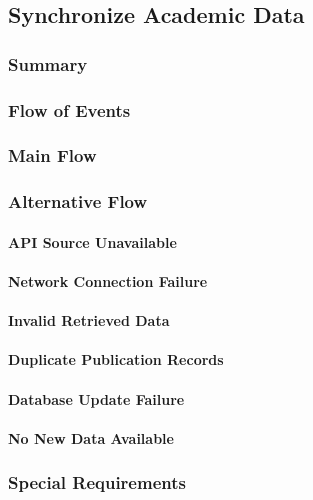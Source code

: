 \subsection{Synchronize Academic Data}
\subsubsection{Summary}

\subsubsection{Flow of Events}
\subsubsection*{Main Flow}

\subsubsection*{Alternative Flow}
\paragraph{API Source Unavailable}

\paragraph{Network Connection Failure}

\paragraph{Invalid Retrieved Data}

\paragraph{Duplicate Publication Records}

\paragraph{Database Update Failure}

\paragraph{No New Data Available}

\subsubsection{Special Requirements}

